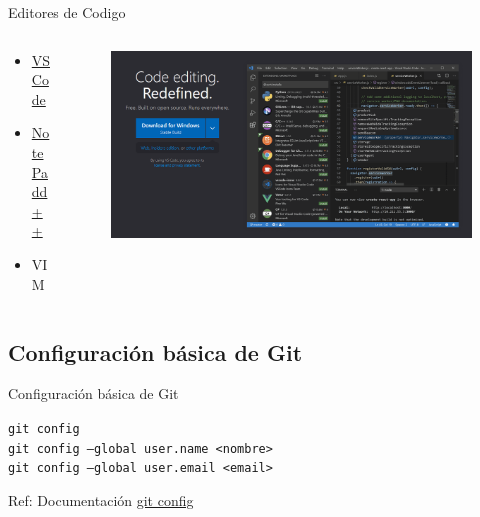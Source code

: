 \documentclass{beamer}
\begin{document}
\begin{frame}{Editores de Codigo}
  
\begin{columns}
  \begin{column}{0.4\textwidth}
    \begin{itemize}
      \LARGE
      \item \href{https://code.visualstudio.com/}{VS Code}
      \item \href{https://notepad-plus-plus.org/downloads/v8.5.4/}{NotePadd++} 
      \item VIM 
    \end{itemize}
  \end{column}
  \begin{column}{0.5\textwidth}
  \begin{figure}
    \includegraphics[width=1.2\textwidth]{images/vscode.png}
  \end{figure}
  \end{column}
\end{columns}


\end{frame}



\subsection{ Configuración básica de Git}
  
  \begin{frame}[containsverbatim]{Configuración básica de Git} 
  
    \begin{block} {}
    {\texttt {git config }} \\ 
    {\texttt {git config --global user.name <nombre>}} \\ 
    {\texttt {git config --global user.email <email>  }}
    \end{block}

  Ref: Documentación \href{https://docs.github.com/es/get-started/getting-started-with-git/setting-your-username-in-gits}{git config }
  \end{frame}
 
\end{document}
